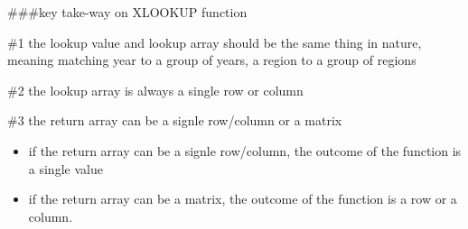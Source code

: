\documentclass[
  letterpaper,
]{scrbook}
\begin{document}
\#\#\#key take-way on XLOOKUP function

\#1 the lookup value and lookup array should be the same thing in
nature, meaning matching year to a group of years, a region to a group
of regions

\#2 the lookup array is always a single row or column

\#3 the return array can be a signle row/column or a matrix

\begin{itemize}
\item
  if the return array can be a signle row/column, the outcome of the
  function is a single value
\item
  if the return array can be a matrix, the outcome of the function is a
  row or a column.
\end{itemize}


\backmatter
\end{document}
